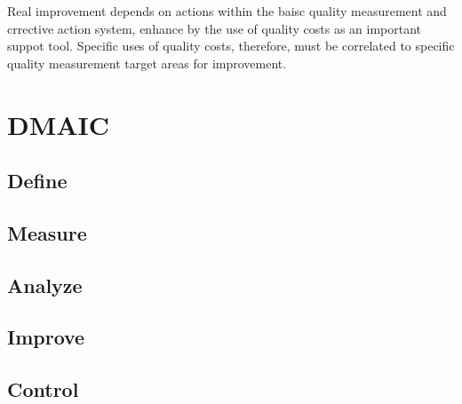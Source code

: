 \documentclass[11pt]{article}
\begin{document}
Real improvement depends on actions within the baisc quality measurement
and crrective action system, enhance by the use of quality costs as an
important suppot tool. Specific uses of quality costs, therefore, must
be correlated to specific quality measurement target areas for
improvement.

    \hypertarget{dmaic}{%
\section{DMAIC}\label{dmaic}}

\hypertarget{define}{%
\subsection{Define}\label{define}}

\hypertarget{measure}{%
\subsection{Measure}\label{measure}}

\hypertarget{analyze}{%
\subsection{Analyze}\label{analyze}}

\hypertarget{improve}{%
\subsection{Improve}\label{improve}}

\hypertarget{control}{%
\subsection{Control}\label{control}}


    
    
    
\end{document}
